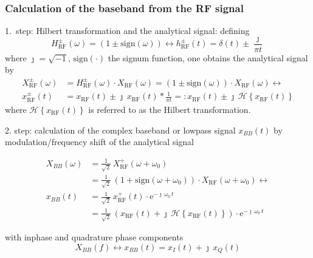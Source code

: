 \documentclass[journal]{IEEEtran}
\newcommand{\no}{\nonumber}
\begin{document}
\subsubsection{Calculation of the baseband from the RF signal}
1.\ step: Hilbert transformation and the analytical signal: defining
\[
H_{\mathrm{RF}}^{\pm}(\omega) = \left(1 {\pm} \mathrm{sign}\left(\omega\right)\right)
\leftrightarrow h_{\mathrm{RF}}^{\pm}(t) = \delta(t) \pm \frac{\jmath}{\pi t} 
\]
where $\jmath = \sqrt{-1}$, $\mathrm{sign}(\cdot)$ the signum function,
one obtains the analytical signal by
\begin{align*}
  \no X_{\mathrm{RF}}^{\pm}\left(\omega\right)
  &=  H_{\mathrm{RF}}^{\pm}(\omega) \cdot X_{\mathrm{RF}}(\omega) = 
  \left(1 \pm \mathrm{sign}\left(\omega\right)\right) \cdot X_{\mathrm{RF}}\left(\omega\right)
     \leftrightarrow\\
  x_{\mathrm{RF}}^\pm(t) &=  x_{\mathrm{RF}}\left(t\right) \pm \jmath \, 
  x_{\mathrm{RF}}\left(t\right) * \frac{1}{\pi t}
    =:  x_{\mathrm{RF}}\left(t\right) \pm \jmath \, \mathcal{H}\left\{x_{\mathrm{RF}}\left(t\right)\right\} 
\end{align*}
where $\mathcal{H}\left\{x_{\mathrm{RF}}\left(t\right)\right\}$ is referred to as 
the Hilbert transformation.

2. step: calculation of the complex baseband or lowpass signal $x_{BB}(t)$ by modulation/frequency shift
of the analytical signal

\begin{align*}
  \no X_{BB}\left(\omega\right) &= \frac{1}{\sqrt{2}} \, X_{\mathrm{RF}}^{+}\left(\omega + \omega_0\right)\\
  & = \frac{1}{\sqrt{2}} \, \left(1 + \mathrm{sign}\left(\omega + \omega_0\right)\right) \cdot X_{\mathrm{RF}}\left(\omega + \omega_0\right) \leftrightarrow\\
  \no x_{BB}\left(t\right) &= \frac{1}{\sqrt{2}} \, x_{\mathrm{RF}}^{+}\left(t\right) 
  \cdot \mathrm{e}^{-\jmath \, \omega_0 \, t} \\
  & = \frac{1}{\sqrt{2}} \, \left(x_{\mathrm{RF}}\left(t\right) + \jmath \,
   \mathcal{H}\left\{x_{\mathrm{RF}}\left(t\right)\right\}\right) 
   \cdot \mathrm{e}^{-\jmath \, \omega_0 \, t}
\end{align*}


with inphase and quadrature phase components
\[
 X_{BB}(f) \leftrightarrow x_{BB}(t) = x_I(t) + \jmath\, x_Q(t)
\]
\end{document}
